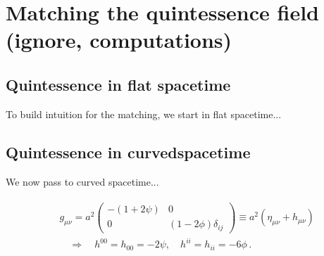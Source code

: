 \section{Matching the quintessence field {\color{red}(ignore, computations)}}



\subsection{Quintessence in flat spacetime}
%
To build intuition for the matching, we start in flat spacetime...






\subsection{Quintessence in curvedspacetime}
%
We now pass to curved spacetime...



\begin{align}\label{eq:newtonian_gauge_metric}
\begin{aligned}
    &g_{\mu\nu}=a^2\begin{pmatrix}
        -(1+2\psi) & 0 \\
        0 & (1-2\phi)\delta_{ij}
    \end{pmatrix}\equiv a^2(\eta_{\mu\nu}+h_{\mu\nu})\\[5pt]
    &\quad \Rightarrow \quad h^{00}=h_{00}=-2\psi,\quad h^{ii}=h_{ii}=-6\phi\,.
\end{aligned}
\end{align}

